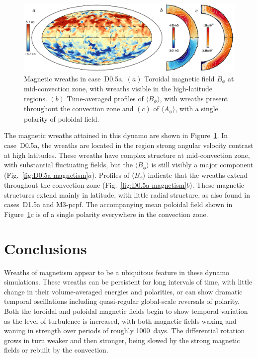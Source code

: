 \begin{figure}[t]
  \begin{center}
    \includegraphics[width=0.9\linewidth]{figs/chapter_8/case_D0.5a_magnetism.eps}
  \end{center}
  \vskip-0.25cm
  \caption[Magnetic wreaths in case~D0.5a]
          {Magnetic wreaths in case~D0.5a.  $(a)$ Toroidal magnetic
            field $B_\phi$ at mid-convection zone, with wreaths
            visible in the high-latitude regions.  $(b)$ Time-averaged
            profiles of $\langle B_\phi \rangle$, with wreaths present
            throughout the convection zone and $(c)$ of $\langle
            A_\phi \rangle$, with a single polarity of poloidal field.
            \label{fig:D0.5a magnetism}}
	  \vskip-0.75cm
\end{figure}

The magnetic wreaths attained in this dynamo are shown in
Figure~\ref{fig:D0.5a magnetism}.  In case~D0.5a, the wreaths are
located in the region strong angular velocity contrast at high
latitudes.  These wreaths have complex structure at mid-convection
zone, with substantial fluctuating fields, but the $\langle B_\phi
\rangle$ is still visibly a major component (Fig.~\ref{fig:D0.5a
  magnetism}$a$).  Profiles of  $\langle B_\phi \rangle$ indicate that
the wreaths extend throughout the convection zone (Fig.~\ref{fig:D0.5a
  magnetism}$b$). These magnetic structures extend mainly in
latitude, with little radial structure, as also found in cases~D1.5a
and M3-pcpf.  The accompanying mean poloidal field shown in
Figure~\ref{fig:D0.5a magnetism}$c$ is of a single polarity
everywhere in the convection zone.





\section{Conclusions}

Wreaths of magnetism appear to be a ubiquitous feature in these dynamo
simulations.  These wreaths can be persistent for long intervals of
time, with little change in their volume-averaged energies and
polarities, or can show dramatic temporal oscillations including
quasi-regular global-scale reversals of polarity.  Both the toroidal
and poloidal magnetic fields begin to show temporal variation as the
level of turbulence is increased, with both magnetic fields waxing and
waning in strength over periods of roughly 1000~days.  
The differential rotation grows in turn weaker and then
stronger, being slowed by the strong magnetic fields or rebuilt by
the convection.  

